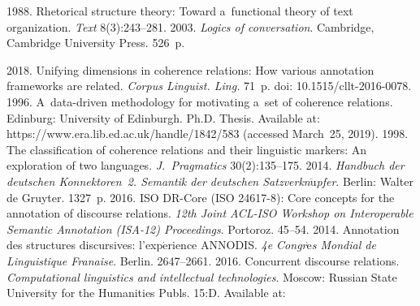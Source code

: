   \begin{multicols}{2}

\renewcommand{\bibname}{\protect\rmfamily References}

{\small\frenchspacing
 {%
 \begin{thebibliography}{99}
 1988. Rhetorical structure theory: Toward 
a~functional theory of text organization. \textit{Text} 8(3):243--281.
 2003. \textit{Logics of conversation}. Cambridge, 
Cambridge University Press. 526~p. 
\columnbreak

 2018. Unifying dimensions in coherence relations: How 
various annotation frameworks are related. \textit{Corpus Linguist. Ling.} 
71~p. doi: 10.1515/cllt-2016-0078. 
 1996. A~data-driven methodology for motivating a~set of coherence relations. 
Edinburg: University of Edinburgh. Ph.D. Thesis.  Available at: {\sf 
https://www.\linebreak era.lib.ed.ac.uk/handle/1842/583} (accessed March~25, 2019).
 1998. The classification of coherence relations and their 
linguistic markers: An exploration of two languages. \textit{J.~Pragmatics} 30(2):135--175.
 2014. 
\textit{Handbuch der deutschen Konnektoren~2. Semantik der deutschen 
Satzverkn$\ddot{\mbox{u}}$pfer}. Berlin: Walter de Gruyter. 1327~p.
 2016. ISO DR-Core (ISO 24617-8): Core concepts for the 
annotation of discourse relations. \textit{12th Joint ACL-ISO Workshop on Interoperable 
Semantic Annotation (ISA-12) Proceedings}. Portoroz. 45--54.
 2014. Annotation des 
structures discursives: l'exp$\acute{\mbox{e}}$rience ANNODIS. \textit{4e 
Congr$\grave{\mbox{e}}$s Mondial de Linguistique \mbox{Fran{\!\!}aise}}. 
Berlin.  2647--2661.
 2016. Concurrent discourse relations. 
\textit{Computational linguistics and 
intellectual technologies}. 
Moscow:
Russian State University for the Humanities \mbox{Publs}. 15:D. Available at: 

\end{thebibliography}}}
\end{multicols}
